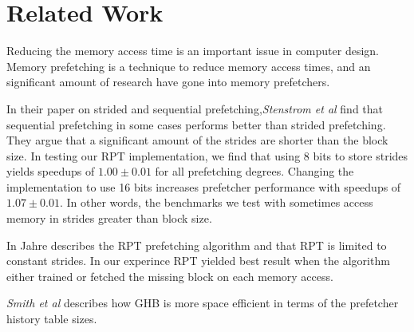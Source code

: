 \section{Related Work}
\label{sec:related-work}

Reducing the memory access time is an important issue in computer
design.  Memory prefetching is a technique to reduce memory access
times, and an significant amount of research have gone into memory
prefetchers.

In their paper on strided and sequential prefetching,\textit{Stenstrom
  et al} \cite{bib:stride} find that sequential prefetching in some
cases performs better than strided prefetching.  They argue that a
significant amount of the strides are shorter than the block size.  In
testing our RPT implementation, we find that using 8 bits to store
strides yields speedups of $1.00\pm0.01$ for all prefetching
degrees. Changing the implementation to use 16 bits increases
prefetcher performance with speedups of $1.07\pm0.01$. In other words,
the benchmarks we test with sometimes access memory in strides greater
than block size.

In \cite{bib:jahre}
Jahre describes the RPT prefetching algorithm and that RPT is limited to constant strides.
In our experince RPT yielded best result when the algorithm either trained or fetched the missing block on each memory access.

\textit{Smith et al} \cite{bib:ghb}
describes how GHB is more space efficient in terms of the prefetcher history table sizes.




